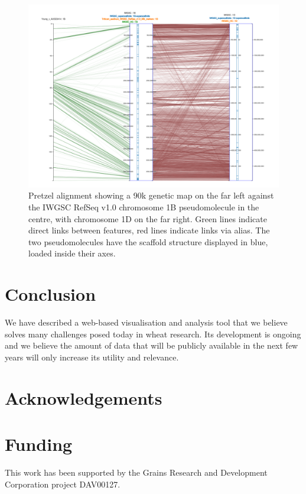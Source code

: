 \documentclass{bioinfo}
\begin{document}
\begin{figure}[!tpb]%
\centering
\includegraphics[width=.5\textwidth]{pretzel.png}
\caption{
  Pretzel alignment showing a 90k genetic map on the far left against the IWGSC RefSeq v1.0 chromosome 1B pseudomolecule in the centre, 
  with chromosome 1D on the far right. 
  Green lines indicate direct links between features, red lines indicate links via alias. 
  The two pseudomolecules have the scaffold structure displayed in blue, loaded inside their axes.
}
\label{fig:01}
\end{figure}


%
%






\section{Conclusion}

We have described a web-based visualisation and analysis tool that we believe solves many challenges posed today in wheat research. 
Its development is ongoing and we believe the amount of data that will be publicly available in the next few years will only increase its utility and relevance.

\section*{Acknowledgements}



\section*{Funding}

This work has been supported by the Grains Research and Development Corporation project DAV00127.\vspace*{-12pt}




\end{document}
